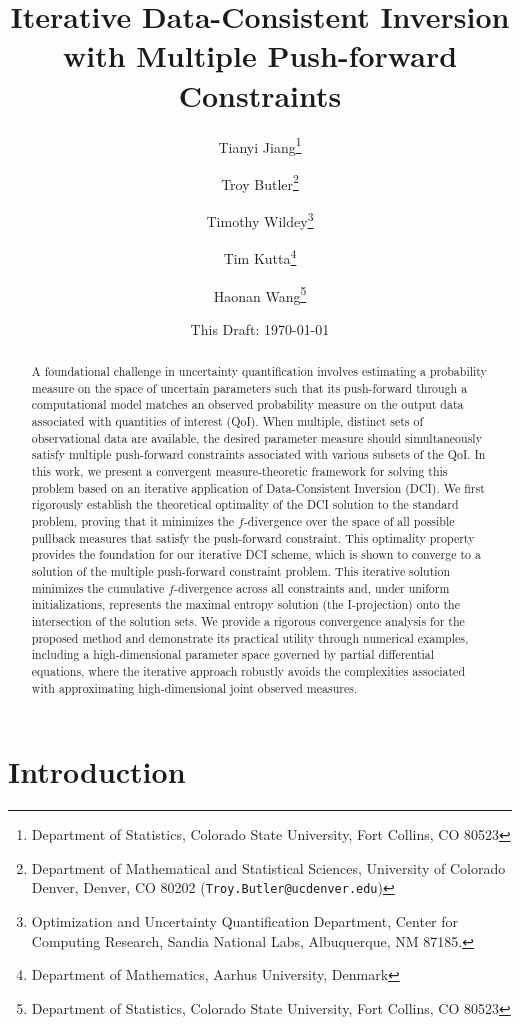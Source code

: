 \documentclass{article}
\title{Iterative Data-Consistent Inversion with Multiple Push-forward Constraints}
\author{Tianyi Jiang\thanks{Department of Statistics, Colorado State University, Fort Collins, CO 80523} \and
Troy Butler\thanks{Department of Mathematical and Statistical Sciences, University of Colorado Denver, Denver, CO 80202 ({\tt Troy.Butler@ucdenver.edu})}
  \and
    Timothy Wildey\thanks{Optimization and Uncertainty Quantification Department, Center for Computing Research, Sandia National Labs, Albuquerque, NM 87185.}
    \and
    Tim Kutta\thanks{Department of Mathematics, Aarhus University, Denmark}
    \and 
    Haonan Wang\thanks{Department of Statistics, Colorado State University, Fort Collins, CO 80523}}
\date{{\normalsize This Draft: \today}}
\newcounter{example}[section]
\begin{document}
\maketitle

\begin{abstract}
A foundational challenge in uncertainty quantification involves estimating a probability measure on the space of uncertain parameters such that its push-forward through a computational model matches an observed probability measure on the output data associated with quantities of interest (QoI). When multiple, distinct sets of observational data are available, the desired parameter measure should simultaneously satisfy multiple push-forward constraints associated with various subsets of the QoI. In this work, we present a convergent measure-theoretic framework for solving this problem based on an iterative application of Data-Consistent Inversion (DCI). We first rigorously establish the theoretical optimality of the DCI solution to the standard problem, proving that it minimizes the $f$-divergence over the space of all possible pullback measures that satisfy the push-forward constraint. This optimality property provides the foundation for our iterative DCI scheme, which is shown to converge to a solution of the multiple push-forward constraint problem. This iterative solution minimizes the cumulative $f$-divergence across all constraints and, under uniform initializations, represents the maximal entropy solution (the I-projection) onto the intersection of the solution sets. We provide a rigorous convergence analysis for the proposed method and demonstrate its practical utility through numerical examples, including a high-dimensional parameter space governed by partial differential equations, where the iterative approach robustly avoids the complexities associated with approximating high-dimensional joint observed measures.
\end{abstract}


\section{Introduction}
\end{document}
